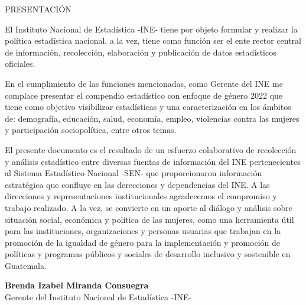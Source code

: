 $\ $\\[3cm]
\begin{center}
{\Bold \LARGE PRESENTACIÓN}\\[2cm]
\end{center}

El Instituto Nacional de Estadística -INE- tiene por objeto formular y realizar la política estadística nacional, a la vez, tiene como función ser el ente rector central de información, recolección, elaboración y publicación de datos estadísticos oficiales.  

En el cumplimiento de las funciones mencionadas, como Gerente del INE me complace presentar el compendio estadístico con enfoque de género 2022 que tiene como objetivo visibilizar estadísticas y una caracterización en los ámbitos de: demografía, educación, salud, economía, empleo, violencias contra las mujeres y participación sociopolítica, entre otros temas. 

El presente documento es el resultado de un esfuerzo colaborativo de recolección y análisis estadístico entre diversas fuentas de información del INE pertenecientes al Sistema Estadístico Nacional -SEN- que proporcionaron información estratégica que confluye en las derecciones y dependencias del INE. A las direcciones y representaciones institucionales agradecemos el compromiso y trabajo realizado. A la vez, se convierte en un aporte al diálogo y análisis sobre situación social, económica y política de las mujeres, como una herramienta útil para las instituciones, organizaciones y personas usuarias que trabajan en la promoción de la igualdad de género para la implementación y promoción de políticas y programas públicos y sociales de desarrollo inclusivo y sostenible en Guatemala.\\[1cm]

\begin{center}
\textbf{Brenda Izabel Miranda Consuegra}\\[0.2cm]
Gerente del Instituto Nacional de Estadística -INE-
\end{center}

